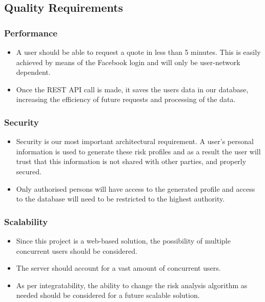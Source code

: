 \documentclass{article}
\begin{document}
	
	\subsection{Quality Requirements}
		\subsubsection{Performance}
		\begin{itemize}
			\item A user should be able to request a quote in less than 5 minutes. This is easily achieved by means of the Facebook login and will only be user-network dependent.
			\item Once the REST API call is made, it saves the users data in our database, increasing the efficiency of future requests and processing of the data.
		\end{itemize}
		 
		\subsubsection{Security}\label{subsubsec:security}
		\begin{itemize}
			\item Security is our most important architectural requirement. A user's personal information is used to generate these risk profiles and as a result the user will trust that this information is not shared with other parties, and properly secured.
			\item Only authorised persons will have access to the generated profile and access to the database will need to be restricted to the highest authority.
		\end{itemize}
		\subsubsection{Scalability}
		\begin{itemize}
			\item Since this project is a web-based solution, the possibility of multiple concurrent users should be considered.
			\item The server should account for a vast amount of concurrent users.
			\item As per integratability, the ability to change the risk analysis algorithm as needed should be considered for a future scalable solution.
		\end{itemize}
\end{document}

